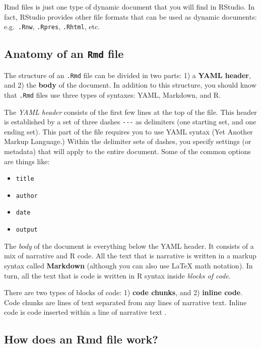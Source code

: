 \documentclass[
]{book}
\providecommand{\tightlist}{%
  \setlength{\itemsep}{0pt}\setlength{\parskip}{0pt}}
\begin{document}
Rmd files is just one type of dynamic document that you will find in RStudio.
In fact, RStudio provides other file formats that can be used
as dynamic documents: e.g.~\texttt{.Rnw}, \texttt{.Rpres}, \texttt{.Rhtml}, etc.

\hypertarget{anatomy-of-an-rmd-file}{%
\subsection{\texorpdfstring{Anatomy of an \texttt{Rmd} file}{Anatomy of an Rmd file}}\label{anatomy-of-an-rmd-file}}

The structure of an \texttt{.Rmd} file can be divided in two parts: 1) a \textbf{YAML header},
and 2) the \textbf{body} of the document. In addition to this structure, you should
know that \texttt{.Rmd} files use three types of syntaxes: YAML, Markdown, and R.

The \emph{YAML header} consists of the first few lines at the top of the file.
This header is established by a set of three dashes \texttt{-\/-\/-} as delimiters
(one starting set, and one ending set). This part of the file requires you
to use YAML syntax (Yet Another Markup Language.)
Within the delimiter sets of dashes, you specify settings (or metadata) that
will apply to the entire document. Some of the common
options are things like:

\begin{itemize}
\tightlist
\item
  \texttt{title}
\item
  \texttt{author}
\item
  \texttt{date}
\item
  \texttt{output}
\end{itemize}

The \emph{body} of the document is everything below the YAML header. It consists
of a mix of narrative and R code. All the text that is narrative is written
in a markup syntax called \textbf{Markdown} (although you can also use LaTeX math
notation). In turn, all the text that is code
is written in R syntax inside \emph{blocks of code}.

There are two types of blocks of code: 1) \textbf{code chunks}, and
2) \textbf{inline code}. Code chunks are lines of text separated from any lines of
narrative text. Inline code is code inserted within a line of narrative text .

\hypertarget{how-does-an-rmd-file-work}{%
\subsection{How does an Rmd file work?}\label{how-does-an-rmd-file-work}}
\end{document}
